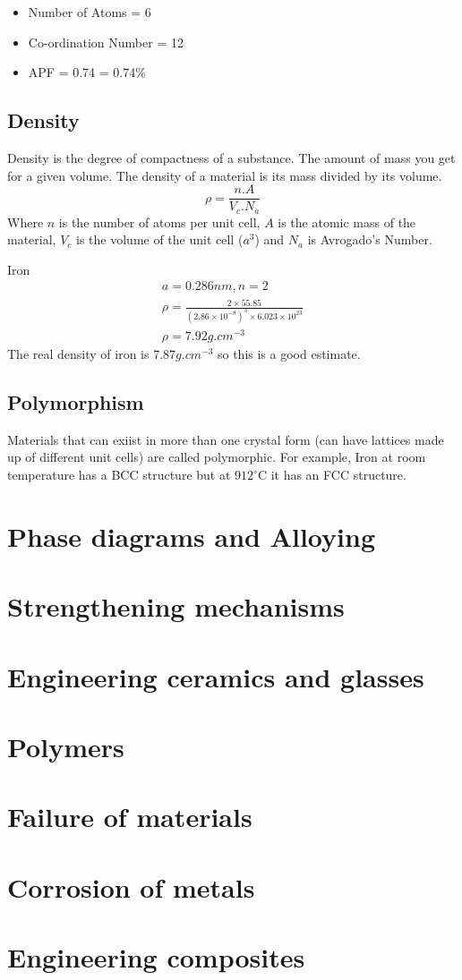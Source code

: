 \documentclass[12pt]{article}
\begin{document}
\begin{itemize}
  \item Number of Atoms = $6$
  \item Co-ordination Number = 12 
  \item APF = 0.74 = 0.74\%
\end{itemize}

\subsection{Density}
Density is the degree of compactness of a substance. 
The amount of mass you get for a given volume.
The density of a material is its mass divided by its volume.
\begin{equation*}
  \rho = \frac{n.A}{V_c.N_a}
\end{equation*}
Where $n$ is the number of atoms per unit cell, $A$ is the atomic mass of the material, $V_c$ is the volume of the unit cell ($a^3$) and $N_a$ is Avrogado's Number.

\begin{example}
  Iron
  \begin{gather*}
    a = 0.286\unit{nm }, n = 2 \\
    \rho = \frac{ 2 \times 55.85 }{(2.86\times10^{-8})^3 \times 6.023 \times 10^{23}} \\
    \rho = 7.92\unit{g.cm}^{-3}
  \end{gather*}
  The real density of iron is 7.87$\unit{g.cm}^{-3}$ so this is a good estimate.
\end{example}

\subsection{Polymorphism}
Materials that can exiist in more than one crystal form (can have lattices made up of different unit cells) are called polymorphic. 
For example, Iron at room temperature has a BCC structure but at $912^\circ$C it has an FCC structure.

\section{Phase diagrams and Alloying}
\section{Strengthening mechanisms}
\section{Engineering ceramics and glasses}
\section{Polymers}
\section{Failure of materials}
\section{Corrosion of metals}
\section{Engineering composites}
\end{document}
